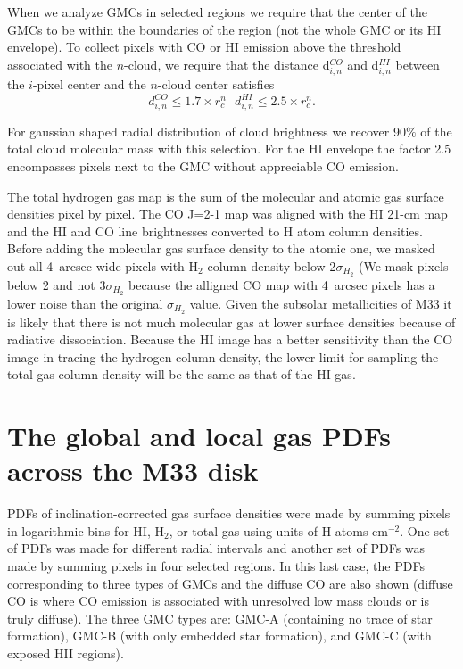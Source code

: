 \documentclass{aa}
\begin{document}
When we analyze GMCs in selected regions we require that the center of the GMCs to
be within the boundaries of the region (not the whole GMC or its HI envelope). To
collect pixels with CO  or HI emission above the threshold associated with the
$n$-cloud, we require that the distance d$_{i,n}^{CO}$ and d$_{i,n}^{HI}$ between
the $i$-pixel center and the $n$-cloud center satisfies
\begin{equation}
d_{i,n}^{CO} \le 1.7 \times r_c^n  \ \ \  d_{i,n}^{HI} \le 2.5\times r_c^n.
\end{equation}

For gaussian shaped radial distribution of cloud brightness  we recover 90$\%$ of the 
total  cloud  molecular mass with this selection. For the HI envelope the factor 2.5 
encompasses pixels next to the GMC without appreciable CO emission. 

The total hydrogen gas map is the sum of the molecular and atomic gas surface
densities pixel by pixel. The CO J=2-1 map was aligned with the HI 21-cm map and
the HI and CO line brightnesses converted to H atom column densities. Before
adding the  molecular gas surface density to the atomic one, we masked out all
4~arcsec  wide pixels with H$_2$ column density below 2$\sigma_{H_2}$
(We mask pixels below 2 and not 3$\sigma_{H_2}$ because
 the alligned CO map with 4~arcsec  pixels has a lower noise than
the original $\sigma_{H_2}$ value. 
Given the subsolar metallicities of M33 it is likely that there is not much molecular gas
at lower surface densities because of radiative dissociation. Because the 
HI image has a better sensitivity than the CO image in tracing the hydrogen
column density,  the lower limit for  sampling the total gas column density 
will be the same as that of the HI gas. 


\section{The global and local gas PDFs across the M33 disk}
\label{pdf}


PDFs of inclination-corrected gas surface densities were made by summing pixels in
logarithmic bins for HI, H$_2$, or total gas using units of H atoms cm$^{-2}$. One
set of PDFs was made for different radial intervals  and another set of PDFs was
made by summing pixels in four selected regions. In this last case, the PDFs
corresponding to three types of GMCs  and the diffuse CO are also shown (diffuse
CO is where CO emission is associated with unresolved low mass clouds or is truly
diffuse). The three GMC types are: GMC-A (containing no trace of star formation),
GMC-B (with only embedded star formation), and GMC-C (with exposed HII regions).
\end{document}
